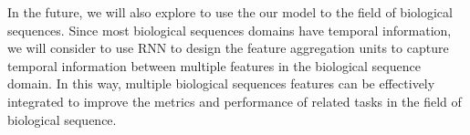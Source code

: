 \documentclass[10pt,twocolumn,letterpaper]{article}
\begin{document}
In the future, we will also explore to use the our model to the field of biological sequences. Since most biological sequences domains have temporal information, we will consider to use RNN to design the feature aggregation units to capture temporal information between multiple features in the biological sequence domain. In this way, multiple biological sequences features can be effectively integrated to improve the metrics and performance of related tasks in the field of biological sequence.

{\small


}
\end{document}
